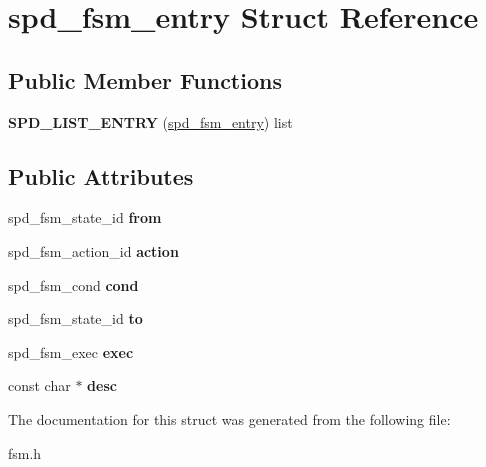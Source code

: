 \hypertarget{structspd__fsm__entry}{
\section{spd\_\-fsm\_\-entry Struct Reference}
\label{structspd__fsm__entry}
}
\subsection*{Public Member Functions}
\begin{DoxyCompactItemize}
\item 
\hypertarget{structspd__fsm__entry_a8dd25de9892100581dabfadbb1230bf1}{
{\bfseries SPD\_\-LIST\_\-ENTRY} (\hyperlink{structspd__fsm__entry}{spd\_\-fsm\_\-entry}) list}
\label{structspd__fsm__entry_a8dd25de9892100581dabfadbb1230bf1}

\end{DoxyCompactItemize}
\subsection*{Public Attributes}
\begin{DoxyCompactItemize}
\item 
\hypertarget{structspd__fsm__entry_a09ec45a80fedf03fd5e1796d07706909}{
spd\_\-fsm\_\-state\_\-id {\bfseries from}}
\label{structspd__fsm__entry_a09ec45a80fedf03fd5e1796d07706909}

\item 
\hypertarget{structspd__fsm__entry_ad621eb85c4acd6695abb1edcbfb85327}{
spd\_\-fsm\_\-action\_\-id {\bfseries action}}
\label{structspd__fsm__entry_ad621eb85c4acd6695abb1edcbfb85327}

\item 
\hypertarget{structspd__fsm__entry_afcd8458a2220657efff0b45482b5f520}{
spd\_\-fsm\_\-cond {\bfseries cond}}
\label{structspd__fsm__entry_afcd8458a2220657efff0b45482b5f520}

\item 
\hypertarget{structspd__fsm__entry_ac93e8e103efe8474717c2fdb9774a9de}{
spd\_\-fsm\_\-state\_\-id {\bfseries to}}
\label{structspd__fsm__entry_ac93e8e103efe8474717c2fdb9774a9de}

\item 
\hypertarget{structspd__fsm__entry_af734013916c3b933c5c79870d86db7d9}{
spd\_\-fsm\_\-exec {\bfseries exec}}
\label{structspd__fsm__entry_af734013916c3b933c5c79870d86db7d9}

\item 
\hypertarget{structspd__fsm__entry_a7e19c6bfdcacd176b55a694cd4b664b7}{
const char $\ast$ {\bfseries desc}}
\label{structspd__fsm__entry_a7e19c6bfdcacd176b55a694cd4b664b7}

\end{DoxyCompactItemize}


The documentation for this struct was generated from the following file:\begin{DoxyCompactItemize}
\item 
fsm.h\end{DoxyCompactItemize}
